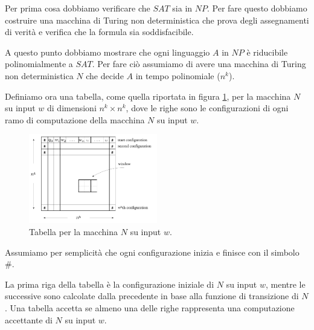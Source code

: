 \begin{dimostrazione}
    Per prima cosa dobbiamo verificare che $SAT$ sia in $NP$. Per fare questo
    dobbiamo costruire una macchina di Turing non deterministica che prova degli
    assegnamenti di verità e verifica che la formula sia soddisfacibile.

    A questo punto dobbiamo mostrare che ogni linguaggio $A$ in $NP$ è riducibile
    polinomialmente a $SAT$. Per fare ciò assumiamo di avere una macchina di
    Turing non deterministica $N$ che decide $A$ in tempo polinomiale ($n^k$).

    Definiamo ora una tabella, come quella riportata in figura \ref{fig:tab_levin_cook}, 
    per la macchina $N$ su input $w$ di dimensioni $n^k \times n^k$, dove le 
    righe sono le configurazioni di ogni ramo di computazione della macchina $N$ 
    su input $w$.
    \begin{figure}[!ht]
        \centering
        \includegraphics[width=0.5\textwidth]{img/MacchineTuring/tab_levin_cook.png}
        \caption{Tabella per la macchina $N$ su input $w$.}
        \label{fig:tab_levin_cook}
    \end{figure}

    Assumiamo per semplicità che ogni configurazione inizia e finisce con il simbolo $\#$.

    La prima riga della tabella è la configurazione iniziale di $N$ su input $w$, 
    mentre le successive sono calcolate dalla precedente in base alla funzione di
    transizione di $N$. Una tabella accetta se almeno una delle righe rappresenta 
    una computazione accettante di $N$ su input $w$.
\end{dimostrazione}